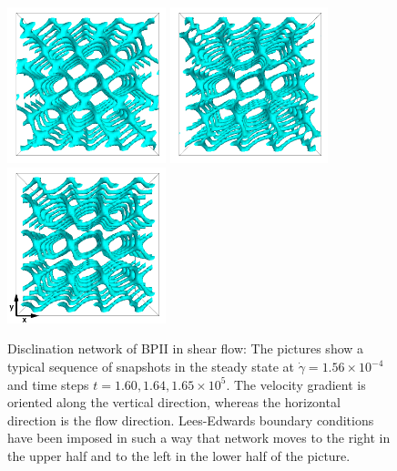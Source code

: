 \documentclass[aps,pre,reprint,superscriptaddress, twocolumn]{revtex4}
\newcommand{\e}[1]{\times10^{#1}}
\newcommand{\gd}{\dot{\gamma}}
\begin{document}
\begin{figure}[htpb]
\includegraphics[width=0.41\textwidth]{disc-160k_run902.png}
\includegraphics[width=0.41\textwidth]{disc-164k_run902.png}
\includegraphics[width=0.41\textwidth]{disc-165k_run902.png}
\caption{Disclination network of BPII in shear flow: 
The pictures show a typical sequence of snapshots in the steady state 
at $\gd=1.56\e{-4}$ and time steps $t=1.60, 1.64,1.65\e{5}$. The velocity 
gradient is oriented along the vertical direction, whereas the 
horizontal direction is the flow direction. Lees-Edwards boundary 
conditions have been imposed in such a way that network moves to the 
right in the upper half and to the left in the lower half of the picture.}
\label{bp2-med}
\end{figure}
\end{document}
